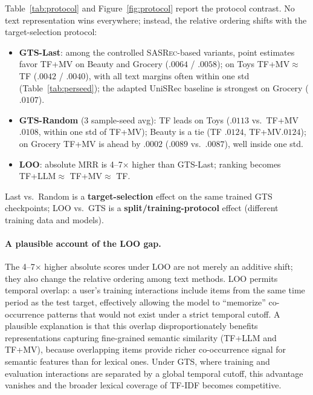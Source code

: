 \documentclass[sigconf,natbib=true,anonymous]{acmart}
\newcommand{\tfidf}{\textsc{TF-IDF}\xspace}
\newcommand{\tfllm}{\textsc{TF+LLM}\xspace}
\newcommand{\tfmv}{\textsc{TF+MV}\xspace}
\newcommand{\base}{\textsc{SASRec}\xspace}
\begin{document}
Table~\ref{tab:protocol} and Figure~\ref{fig:protocol} report the protocol contrast.
No text representation wins everywhere; instead, the relative ordering shifts with the target-selection protocol:

\begin{itemize}[leftmargin=*,itemsep=1pt]
\item \textbf{GTS-Last}: among the controlled \base-based variants, point estimates favor \tfmv on Beauty and Grocery ($.0064$ / $.0058$); on Toys TF+MV${}\approx{}$TF ($.0042$ / $.0040$), with all text margins often within one std (Table~\ref{tab:perseed}); the adapted UniSRec baseline is strongest on Grocery ($.0107$).
\item \textbf{GTS-Random} (3 sample-seed avg): TF leads on Toys ($.0113$ vs.\ \tfmv $.0108$, within one std of \tfmv); Beauty is a tie (TF $.0124$, \tfmv $.0124$); on Grocery \tfmv is ahead by $.0002$ ($.0089$ vs.\ $.0087$), well inside one std.
\item \textbf{LOO}: absolute MRR is 4--7$\times$ higher than GTS-Last; ranking becomes \tfllm $\approx$ \tfmv $\approx$ TF.
\end{itemize}
Last vs.\ Random is a \textbf{target-selection} effect on the same trained GTS checkpoints; LOO vs.\ GTS is a \textbf{split/training-protocol} effect (different training data and models).

\paragraph{A plausible account of the LOO gap.}
The 4--7$\times$ higher absolute scores under LOO are not merely an additive shift; they also change the relative ordering among text methods.
LOO permits temporal overlap: a user's training interactions include items from the same time period as the test target, effectively allowing the model to ``memorize'' co-occurrence patterns that would not exist under a strict temporal cutoff.
A plausible explanation is that this overlap disproportionately benefits representations capturing fine-grained semantic similarity (\tfllm and \tfmv), because overlapping items provide richer co-occurrence signal for semantic features than for lexical ones.
Under GTS, where training and evaluation interactions are separated by a global temporal cutoff, this advantage vanishes and the broader lexical coverage of \tfidf becomes competitive.
\end{document}
